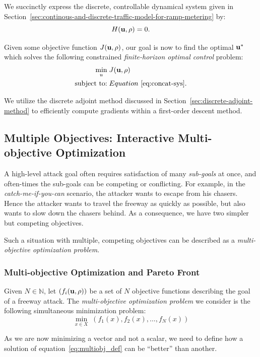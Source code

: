 We succinctly express the discrete, controllable dynamical system given in Section~\ref{sec:continous-and-discrete-traffic-model-for-ramp-metering} by:
	\begin{equation}
	\label{eq:concat-sys}
		H\left(\vectorize{u}, \vectorize{\rho}\right)=0.
	\end{equation}

Given some objective function $J\left(\vectorize{u}, \vectorize{\rho}\right)$, our goal is now to find the optimal $\mathbf{u}^*$ which solves the following constrained \emph{finite-horizon optimal control} problem:
	\begin{align}
		\label{eqn:fhoc}
		\min_{u} \;& J\left(\vectorize{u}, \vectorize{\rho}\right) \\
		\text{subject to:} \;& Equation~\eqref{eq:concat-sys} \label{eqn:repeat-concat-system}.
	\end{align}

We utilize the discrete adjoint method discussed in Section~\ref{sec:discrete-adjoint-method} to efficiently compute gradients within a first-order descent method.

\subsection{Multiple Objectives: Interactive Multi-objective Optimization}
	\label{sub:moo}
		A high-level attack goal often requires satisfaction of many \emph{sub-goals} at once, and often-times the sub-goals can be competing or conflicting. For example, in the \emph{catch-me-if-you-can} scenario, the attacker wants to escape from his chasers. Hence the attacker wants to travel the freeway as quickly as possible, but also wants to slow down the chasers behind. As a consequence, we have two simpler but competing objectives.

		Such a situation with multiple, competing objectives can be described as a \emph{multi-objective optimization problem}.

		\subsubsection{Multi-objective Optimization and Pareto Front}
			\begin{definition}
			Given $N \in \mathbb{N}$, let $ ( f_i\left(\vectorize{u}, \vectorize{\rho}\right))$ be a set of $N$ objective functions describing the goal of a freeway attack. The \emph{multi-objective optimization problem} we consider is the following simultaneous minimization problem:
				\begin{equation}\label{eq:multiobj_def}
						\min_{x\in X} \; \left(f_1(x), f_2(x),\ldots, f_N(x) \right)
				\end{equation}
			\end{definition}
			As we are now minimizing a vector and not a scalar, we need to define how a solution of equation~\eqref{eq:multiobj_def} can be ``better'' than another.

